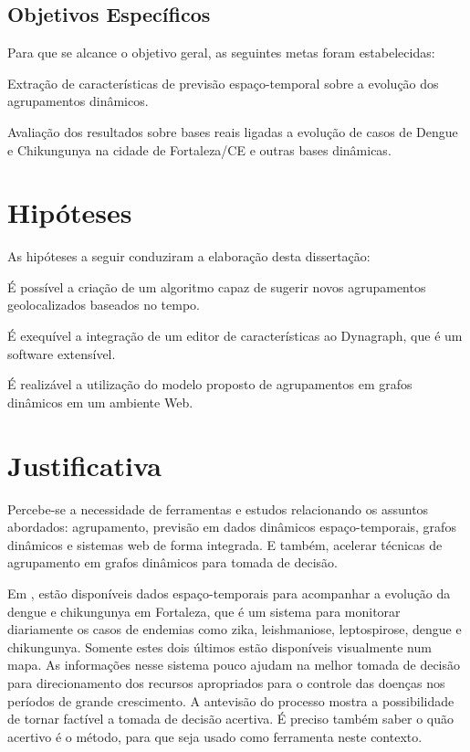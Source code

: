 \subsection{Objetivos Específicos}
\label{sec:objetivos-especificos}

Para que se alcance o objetivo geral, as seguintes metas foram estabelecidas:

\begin{alineas}
	\item Extração de características de previsão espaço-temporal sobre a evolução dos agrupamentos dinâmicos.
	\item Avaliação dos resultados sobre bases reais ligadas a evolução de casos de Dengue e Chikungunya na cidade de Fortaleza/CE e outras bases dinâmicas.
\end{alineas}

\section{Hipóteses}
As hipóteses a seguir conduziram a elaboração desta dissertação:
\begin{alineas}
	\item É possível a criação de um algoritmo capaz de sugerir novos agrupamentos geolocalizados baseados no tempo.
	\item É exequível a integração de um editor de características ao Dynagraph, que é um software extensível.
	\item É realizável a utilização do modelo proposto de agrupamentos em grafos dinâmicos em um ambiente Web.
\end{alineas}

\section{Justificativa}
Percebe-se a necessidade de ferramentas e estudos 
relacionando os assuntos abordados: agrupamento, previsão em dados
dinâmicos espaço-temporais, grafos dinâmicos e sistemas web de forma integrada.
E também, acelerar técnicas de agrupamento em grafos dinâmicos para tomada de decisão.

Em \cite{simda}, estão disponíveis dados espaço-temporais para acompanhar a evolução da dengue e chikungunya em Fortaleza, que é um sistema para monitorar diariamente os casos de endemias como zika, leishmaniose, leptospirose, dengue e chikungunya. Somente estes dois últimos estão disponíveis visualmente num mapa. As informações nesse sistema pouco ajudam na melhor tomada de decisão para direcionamento dos recursos apropriados para o controle das doenças nos períodos de grande crescimento. A antevisão do processo mostra a possibilidade de tornar factível a tomada de decisão acertiva. É preciso também saber o quão acertivo é o método, para que seja usado como ferramenta neste contexto.

